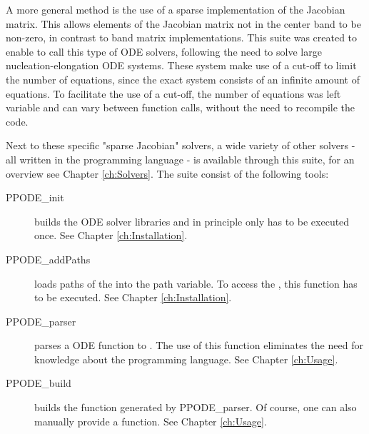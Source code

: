 A more general method is the use of a sparse implementation of the Jacobian matrix. This allows elements of the Jacobian matrix not in the center band to be non-zero, in contrast to band matrix implementations. This suite was created to enable \MATLAB to call this type of ODE solvers, following the need to solve large nucleation-elongation ODE systems. These system make use of a cut-off to limit the number of equations, since the exact system consists of an infinite amount of equations. To facilitate the use of a cut-off, the number of equations was left variable and can vary between function calls, without the need to recompile the code.

Next to these specific "sparse Jacobian" solvers, a wide variety of other solvers - all written in the \Fortran programming language - is available through this suite, for an overview see Chapter \ref{ch:Solvers}. The suite consist of the following tools:
\begin{description}
 \item[PPODE\_init] builds the ODE solver libraries and in principle only has to be executed once. See Chapter \ref{ch:Installation}.
 \item[PPODE\_addPaths] loads paths of the \PPODESUITE into the \MATLAB path variable. To access the \PPODESUITE, this function has to be executed. See Chapter \ref{ch:Installation}.
 \item[PPODE\_parser] parses a \MATLAB ODE function to \Fortran. The use of this function eliminates the need for knowledge about the \Fortran programming language. See Chapter \ref{ch:Usage}.
 \item[PPODE\_build] builds the \Fortran function generated by PPODE\_parser. Of course, one can also manually provide a \Fortran function. See Chapter \ref{ch:Usage}.
\end{description}
